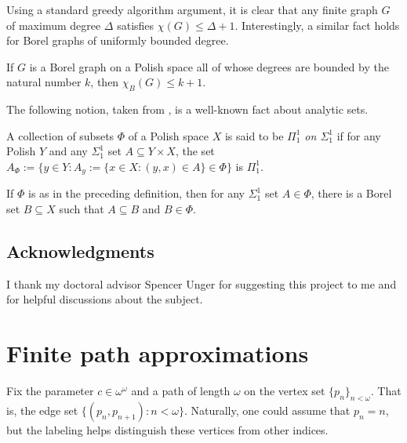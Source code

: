 \documentclass[12pt]{article}
\begin{document}
Using a standard greedy algorithm argument, it is clear that any finite graph $G$ of maximum degree $\Delta$ satisfies $\chi(G)\leq\Delta+1$.
Interestingly, a similar fact holds for Borel graphs of uniformly bounded degree.

\begin{theorem}\label{prop:brooks}
    If $G$ is a Borel graph on a Polish space all of whose degrees are bounded by the natural number $k$, then $\chi_B(G)\leq k+1$.
\end{theorem}

The following notion, taken from \cite[Theorem~35.10, p.~285]{Kechris_1995_DescriptiveSetTheory}, is a well-known fact about analytic sets.

\begin{definition}\label{def:pi11-on-sigma11}
    A collection of subsets $\Phi$ of a Polish space $X$ is said to be \emph{$\Pi^1_1$ on $\Sigma^1_1$} if for any Polish $Y$ and any $\Sigma^1_1$ set $A\subseteq Y\times X$, the set $A_\Phi:=\{y\in Y:A_y:=\{x\in X:(y,x)\in A\}\in\Phi\}$ is $\Pi^1_1$.
\end{definition}

\begin{lemma}\label{lemma:first-reflection}
    If $\Phi$ is as in the preceding definition, then for any $\Sigma^1_1$ set $A\in\Phi$, there is a Borel set $B\subseteq X$ such that $A\subseteq B$ and $B\in\Phi$.
\end{lemma}

\subsection*{Acknowledgments}
I thank my doctoral advisor Spencer Unger for suggesting this project to me and for helpful discussions about the subject.

\section{Finite path approximations}\label{sec:finite-path-approx}

Fix the parameter $c\in\omega^\omega$ and a path of length $\omega$ on the vertex set $\{p_n\}_{n<\omega}$.
That is, the edge set $\{(p_n,p_{n+1}):n<\omega\}$.
Naturally, one could assume that $p_n=n$, but the labeling helps distinguish these vertices from other indices.
\end{document}
